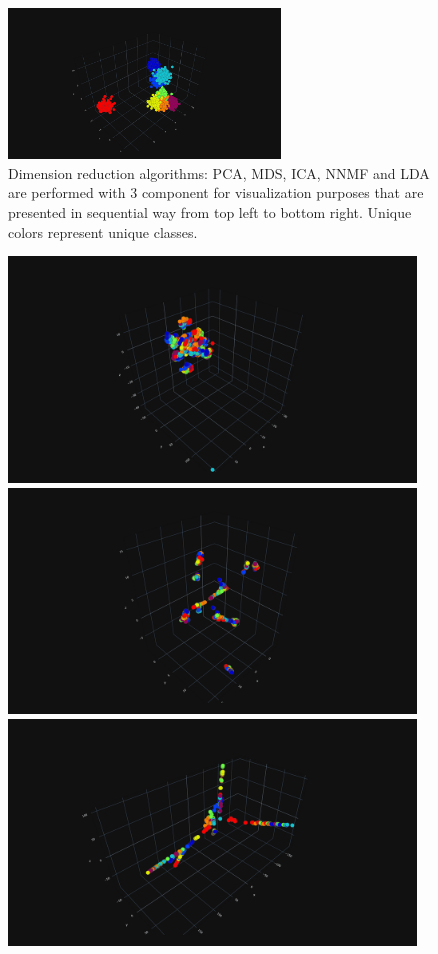 \documentclass[10pt, twocolumn, letterpaper]{article}
\begin{document}
\begin{figure}
    \includegraphics[width=.5\linewidth, height=4cm,  valign=c]{images/lda_3d.png}
    \caption{Dimension reduction algorithms: PCA, MDS, ICA, NNMF and LDA are performed with 3 component for visualization purposes that are presented in sequential way from top left to bottom right. Unique colors represent unique classes.}\label{fig:dim}
\end{figure}


\begin{figure}
     \includegraphics[width=.33\linewidth, height=6cm,  valign=c]{images/tsene_3d.png}
    \includegraphics[width=.33\linewidth, height=6cm,  valign=c]{images/umap_3d.png}
    \includegraphics[width=.33\linewidth, height=6cm,  valign=c]{images/isomap_3d.png}

\end{figure}
\end{document}
